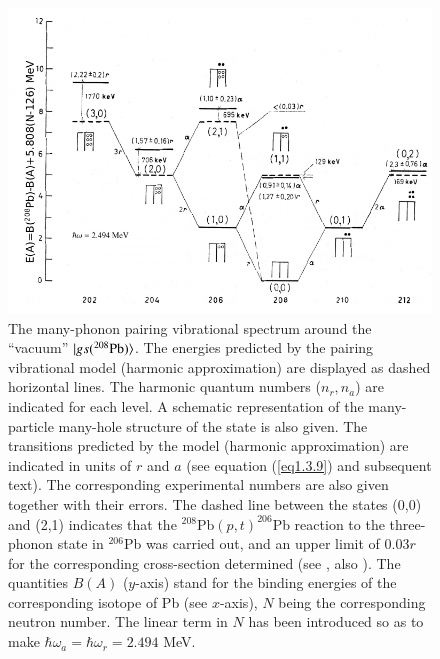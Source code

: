 \begin{figure}
	\centerline {
		\includegraphics*[width=15cm, angle=0.]{introduccion/figs/fig1_3_2}
	}
	\caption{The many-phonon pairing vibrational spectrum around the ``vacuum'' $|{gs(^{208}\text{Pb})} \rangle$. The energies predicted by the pairing vibrational model (harmonic approximation) are displayed as dashed horizontal lines. The harmonic quantum numbers ($n_r,n_a$) are indicated for each level. A schematic representation of the many-particle many-hole structure of the state is also given. The transitions predicted by the model (harmonic approximation) are indicated in units of $r$ and $a$ (see equation (\ref{eq1.3.9}) and subsequent text). The corresponding experimental numbers are also given together with their errors. The dashed line between the states (0,0) and (2,1) indicates that the $^{208}$Pb$(p,t)^{206}$Pb reaction to the three-phonon state in $^{206}$Pb was carried out, and an upper limit of 0.03$r$ for the corresponding cross-section  determined (see \cite{Flynn:72} \cite{Broglia:73}, also \cite{Lanford:73}). The quantities $B(A)$ ($y$-axis) stand for the binding energies of the corresponding isotope of Pb (see $x$-axis), $N$ being the corresponding neutron number. The linear term in $N$ has been introduced so as to make $\hbar\omega_a=\hbar\omega_r=2.494$ MeV.}
	\label{fig0.3.2}
\end{figure}

